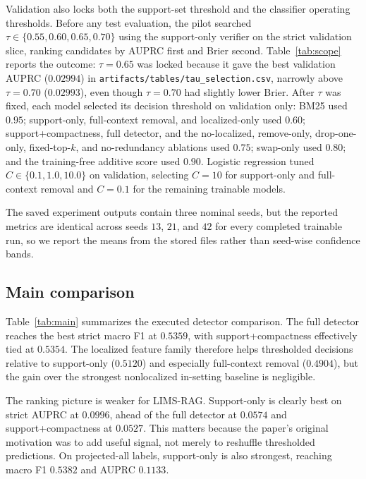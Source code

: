 \documentclass{article}
\begin{document}
Validation also locks both the support-set threshold and the classifier operating thresholds. Before any test evaluation, the pilot searched $\tau \in \{0.55,0.60,0.65,0.70\}$ using the support-only verifier on the strict validation slice, ranking candidates by AUPRC first and Brier second. Table~\ref{tab:scope} reports the outcome: $\tau=0.65$ was locked because it gave the best validation AUPRC ($0.02994$) in \texttt{artifacts/tables/tau\_selection.csv}, narrowly above $\tau=0.70$ ($0.02993$), even though $\tau=0.70$ had slightly lower Brier. After $\tau$ was fixed, each model selected its decision threshold on validation only: BM25 used $0.95$; support-only, full-context removal, and localized-only used $0.60$; support+compactness, full detector, and the no-localized, remove-only, drop-one-only, fixed-top-$k$, and no-redundancy ablations used $0.75$; swap-only used $0.80$; and the training-free additive score used $0.90$. Logistic regression tuned $C \in \{0.1,1.0,10.0\}$ on validation, selecting $C=10$ for support-only and full-context removal and $C=0.1$ for the remaining trainable models.

The saved experiment outputs contain three nominal seeds, but the reported metrics are identical across seeds $13$, $21$, and $42$ for every completed trainable run, so we report the means from the stored files rather than seed-wise confidence bands.

\subsection{Main comparison}
Table~\ref{tab:main} summarizes the executed detector comparison. The full detector reaches the best strict macro F1 at $0.5359$, with support+compactness effectively tied at $0.5354$. The localized feature family therefore helps thresholded decisions relative to support-only ($0.5120$) and especially full-context removal ($0.4904$), but the gain over the strongest nonlocalized in-setting baseline is negligible.

The ranking picture is weaker for LIMS-RAG. Support-only is clearly best on strict AUPRC at $0.0996$, ahead of the full detector at $0.0574$ and support+compactness at $0.0527$. This matters because the paper's original motivation was to add useful signal, not merely to reshuffle thresholded predictions. On projected-all labels, support-only is also strongest, reaching macro F1 $0.5382$ and AUPRC $0.1133$.
\end{document}
